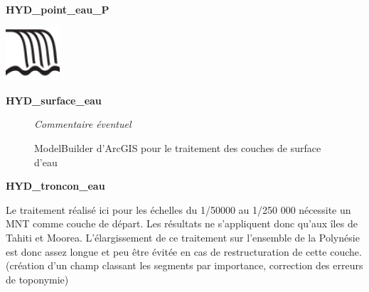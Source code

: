 \documentclass{themeensg}
\begin{document}
\begin{appendices}
\clearpage


\begin{center}
    \Large
    \textbf{HYD\_point\_eau\_P}
\end{center}


\includegraphics[width=2cm]{images/Annexes/modelbuilder/waterfall.png}%



\clearpage


\begin{center}
    \Large
    \textbf{HYD\_surface\_eau}
\end{center}


\addtocounter{figure}{-1}
\begin{figure}
\addtocounter{figure}{1}
\centering
{}%
\caption{ModelBuilder d'ArcGIS pour le traitement des couches de surface d'eau}%
\textit{Commentaire éventuel}
\end{figure}


\clearpage


\begin{center}
    \Large
    \textbf{HYD\_troncon\_eau}
\end{center}

Le traitement réalisé ici pour les échelles du 1/50000 au 1/250 000 nécessite un MNT comme couche de départ. Les résultats ne s'appliquent donc qu'aux îles de Tahiti et Moorea. L'élargissement de ce traitement sur l'ensemble de la Polynésie est donc assez longue et peu être évitée en cas de restructuration de cette couche. (création d'un champ classant les segments par importance, correction des erreurs de toponymie)



\end{appendices}
\end{document}
